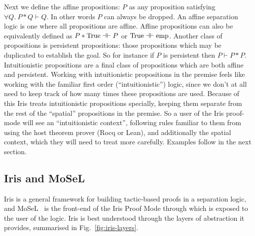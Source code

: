 
Next we define the affine propositions: $P$ as any proposition satisfying $\forall Q.\ P * Q \vdash Q$. In other words $P$ can always be dropped. An affine 
separation logic is one where all propositions are affine. Affine propositions can also be equivalently defined as $P * \mathrm{True} \mathrel{\dashv\vdash} P$ or $\mathrm{True} \mathrel{\dashv\vdash} \mathrm{emp}$.
Another class of propositions is persistent propositions: those propositions which may be duplicated to establish the goal. So for instance if $P$ is persistent then
$P \vdash P * P$.
Intuitionistic propositions are a final class of propositions which are both affine and persistent. Working with intuitionistic propositions in the premise
feels like working with the familiar first order (``intuitionistic'') logic, since we don't at all need to keep track of how many times these propositions are used.
Because of this Iris treats intuitionistic propositions specially, keeping them separate from the rest of the ``spatial'' propositions in the premise. So a user
of the Iris proof-mode will see an ``intuitionistic context'', following rules familiar to them from using the host theorem prover (Rocq or Lean), and additionally
the spatial context, which they will need to treat more carefully. Examples follow in the next section.

\subsection{Iris and MoSeL}
\label{MoSeL}
Iris is a general framework for building tactic-based proofs in a separation logic, and MoSeL~\cite{mosel} is the front-end of the Iris Proof Mode through which is
exposed to the user of the logic.
Iris is best understood through the layers of abstraction it provides, summarised in Fig.~\ref{fig:iris-layers}.

